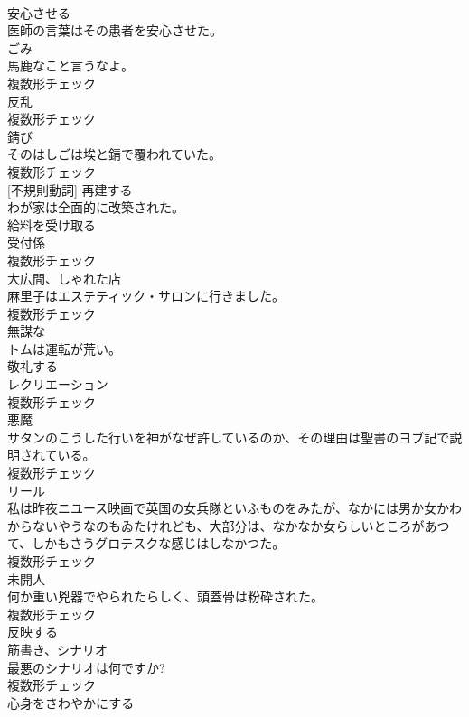 \documentclass[8pt]{extreport}
\begin{document}
\begin{CJK}{UTF8}{min}
\\	[動詞]	安心させる	
\\	医師の言葉はその患者を安心させた。	
\\	[名詞]	ごみ	
\\	馬鹿なこと言うなよ。	
\\	複数形チェック
\\	[名詞]	反乱	
\\	複数形チェック
\\	[名詞]	錆び	
\\	そのはしごは埃と錆で覆われていた。	
\\	複数形チェック
\\	[動詞] [不規則動詞]	再建する	
\\	わが家は全面的に改築された。	
\\	[形容詞]	給料を受け取る	
\\	[名詞]	受付係	
\\	複数形チェック
\\	[名詞]	大広間、しゃれた店	
\\	麻里子はエステティック・サロンに行きました。	
\\	複数形チェック
\\	[形容詞]	無謀な	
\\	トムは運転が荒い。	
\\	[動詞]	敬礼する	
\\	[名詞]	レクリエーション	
\\	複数形チェック
\\	[名詞]	悪魔	
\\	サタンのこうした行いを神がなぜ許しているのか、その理由は聖書のヨブ記で説明されている。	
\\	複数形チェック
\\	[名詞]	リール	
\\	私は昨夜ニユース映画で英国の女兵隊といふものをみたが、なかには男か女かわからないやうなのもゐたけれども、大部分は、なかなか女らしいところがあつて、しかもさうグロテスクな感じはしなかつた。	
\\	複数形チェック
\\	[名詞]	未開人	
\\	何か重い兇器でやられたらしく、頭蓋骨は粉砕された。	
\\	複数形チェック
\\	[形容詞]	反映する	
\\	[名詞]	筋書き、シナリオ	
\\	最悪のシナリオは何ですか?	
\\	複数形チェック
\\	[形容詞]	心身をさわやかにする	

\end{CJK}
\end{document}
